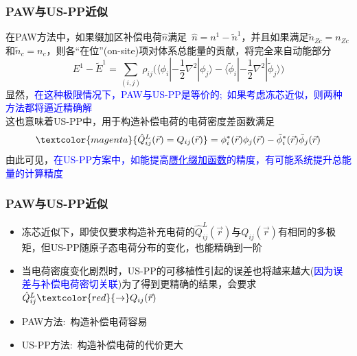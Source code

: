 \frame
{
	\frametitle{\textrm{PAW}与\textrm{US-PP}近似}
	在\textrm{PAW}方法中，如果缀加区补偿电荷$\hat n$满足~$\hat n=n^1-\tilde n^1$，并且如果满足$\tilde n_{Zc}=n_{Zc}$和$\tilde n_c=n_c$，则各“在位”(\textrm{on-site})项对体系总能量的贡献，将完全来自动能部分
	\begin{displaymath}
		E^1-\tilde E^1=\sum_{(i,j)}\rho_{ij}\big(\langle\phi_i|-\frac12\nabla^2|\phi_j\rangle-\langle\tilde\phi_i|-\frac12\nabla^2|\tilde\phi_j\rangle\big)
	\end{displaymath}
	显然，\textcolor{blue}{在这种极限情况下，\textrm{PAW}与\textrm{US-PP}是等价的;~如果考虑冻芯近似，则两种方法都将逼近精确解}\\ 
	这也意味着\textrm{US-PP}中，用于构造补偿电荷的电荷密度差函数满足
	$$\textcolor{magenta}{\hat Q_{ij}^L(\vec r)=Q_{ij}(\vec r)}=\phi_i^{\ast}(\vec r)\phi_j(\vec r)-\tilde\phi_i^{\ast}(\vec r)\tilde\phi_j(\vec r)$$
	由此可见，\textcolor{blue}{在\textrm{US-PP}方案中，如能提高\underline{赝化缀加函数}的精度，有可能系统提升总能量的计算精度}

	{\fontsize{6.5pt}{3.9pt}}
}

\frame
{
	\frametitle{\textrm{PAW}与\textrm{US-PP}近似}
	\begin{itemize}
		\item 冻芯近似下，即使仅要求构造补充电荷的$\hat{Q}_{ij}^L(\vec r)$与$Q_{ij}(\vec r)$有相同的多极矩，但\textrm{US-PP}随原子态电荷分布的变化，也能精确到一阶\\
			{\fontsize{6.5pt}{3.9pt}}
		\item 当电荷密度变化剧烈时，\textrm{US-PP}的可移植性引起的误差也将越来越大(\textcolor{blue}{因为误差与补偿电荷密切关联})为了得到更精确的结果，会要求$\hat{Q}_{ij}^L\textcolor{red}{\rightarrow}Q_{ij}(\vec r)$\\
			{\fontsize{6.5pt}{3.9pt}}
	\end{itemize}
	\begin{itemize}
		\item \textrm{PAW}方法:~构造补偿电荷容易
			\vskip 2pt
			{\fontsize{6.5pt}{3.9pt}\selectfont{引入了全电子波函数，保持电荷密度差的精度\\
		通过电荷密度差的多极矩构造补偿电荷\\
		空间上补偿电荷更延展、更平缓}}
		\item \textrm{US-PP}方法:~构造补偿电荷的代价更大
			\vskip 2pt
			{\fontsize{6.5pt}{3.9pt}}
	\end{itemize}

}


